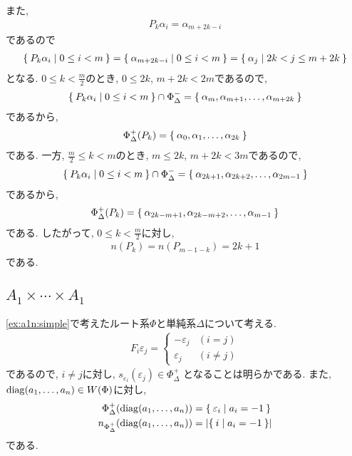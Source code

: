 また,
\begin{align*}
  P_k\alpha_i=\alpha_{m+2k-i}
\end{align*}
であるので
\begin{align*}
\Set{P_k\alpha_i|0\leq i < m}=\Set{\alpha_{m+2k-i}|0\leq i < m}=\Set{\alpha_{j}|2k <j\leq m+2k}
\end{align*}
となる.
$0\leq k <\frac{m}{2}$のとき, $0\leq 2k$, $m+2k<2m$であるので,
\begin{align*}
  \Set{P_k\alpha_i|0\leq i < m}\cap \Phi_\Delta^-=\Set{\alpha_{m},\alpha_{m+1},\ldots,\alpha_{m+2k}}
\end{align*}
であるから,
\begin{align*}
  \Phi_\Delta^+(P_k)=\Set{\alpha_{0},\alpha_{1},\ldots,\alpha_{2k}}
\end{align*}
である.
一方,
$\frac{m}{2}\leq k <m$のとき, $m\leq 2k$, $m+2k<3m$であるので,
\begin{align*}
  \Set{P_k\alpha_i|0\leq i < m}\cap \Phi_\Delta^-=\Set{\alpha_{2k+1},\alpha_{2k+2},\ldots,\alpha_{2m-1}}
\end{align*}
であるから,
\begin{align*}
  \Phi_\Delta^+(P_k)=\Set{\alpha_{2k-m+1},\alpha_{2k-m+2},\ldots,\alpha_{m-1}}
\end{align*}
である. 
したがって, $0\leq k <\frac{m}{2}$に対し,
\begin{align*}
 n(P_{k})=n(P_{m-1-k})=2k+1
\end{align*}
である.




\subsection{$A_{1}\times\cdots\times A_{1}$}
\cref{ex:a1n:simple}で考えたルート系$\Phi$と単純系$\Delta$について考える.
\begin{align*}
  F_i\varepsilon_j=
  \begin{cases}
    -\varepsilon_j &(i=j)\\
    \varepsilon_j &(i\neq j)
  \end{cases}
\end{align*}
であるので,
$i\neq j$に対し,
$s_{\varepsilon_i}(\varepsilon_j)\in\Phi_\Delta^+$
となることは明らかである.
また, $\operatorname{diag}(a_1,\ldots,a_n)\in W(\Phi)$に対し,
\begin{align*}
  \Phi_\Delta^+(\operatorname{diag}(a_1,\ldots,a_n))&=\Set{\varepsilon_i|a_i=-1}\\
  n_{\Phi_\Delta^+}(\operatorname{diag}(a_1,\ldots,a_n))&=\left|\Set{i|a_i=-1}\right|
\end{align*}
である.


